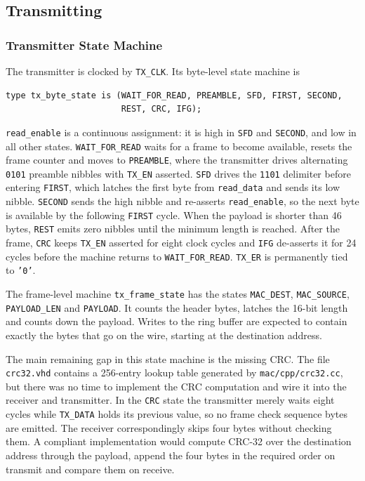 \documentclass[11pt,a4paper]{article}
\begin{document}
\subsection{Transmitting}
\label{sec:tx_fsm}
\subsubsection{Transmitter State Machine}
The transmitter is clocked by \texttt{TX\_CLK}. Its byte-level state machine is

\begin{lstlisting}
type tx_byte_state is (WAIT_FOR_READ, PREAMBLE, SFD, FIRST, SECOND,
                       REST, CRC, IFG);
\end{lstlisting}

\texttt{read\_enable} is a continuous assignment: it is high in \texttt{SFD} and \texttt{SECOND}, and low in all other states. \texttt{WAIT\_FOR\_READ} waits for a frame to become available, resets the frame counter and moves to \texttt{PREAMBLE}, where the transmitter drives alternating \texttt{0101} preamble nibbles with \texttt{TX\_EN} asserted. \texttt{SFD} drives the \texttt{1101} delimiter before entering \texttt{FIRST}, which latches the first byte from \texttt{read\_data} and sends its low nibble. \texttt{SECOND} sends the high nibble and re-asserts \texttt{read\_enable}, so the next byte is available by the following \texttt{FIRST} cycle. When the payload is shorter than 46 bytes, \texttt{REST} emits zero nibbles until the minimum length is reached. After the frame, \texttt{CRC} keeps \texttt{TX\_EN} asserted for eight clock cycles and \texttt{IFG} de-asserts it for 24 cycles before the machine returns to \texttt{WAIT\_FOR\_READ}. \texttt{TX\_ER} is permanently tied to \texttt{'0'}.

The frame-level machine \texttt{tx\_frame\_state} has the states \texttt{MAC\_DEST}, \texttt{MAC\_SOURCE}, \texttt{PAYLOAD\_LEN} and \texttt{PAYLOAD}. It counts the header bytes, latches the 16-bit length and counts down the payload. Writes to the ring buffer are expected to contain exactly the bytes that go on the wire, starting at the destination address.

The main remaining gap in this state machine is the missing CRC. The file \texttt{crc32.vhd} contains a 256-entry lookup table generated by \texttt{mac/cpp/crc32.cc}, but there was no time to implement the CRC computation and wire it into the receiver and transmitter. In the \texttt{CRC} state the transmitter merely waits eight cycles while \texttt{TX\_DATA} holds its previous value, so no frame check sequence bytes are emitted. The receiver correspondingly skips four bytes without checking them. A compliant implementation would compute CRC-32 over the destination address through the payload, append the four bytes in the required order on transmit and compare them on receive.
\end{document}
